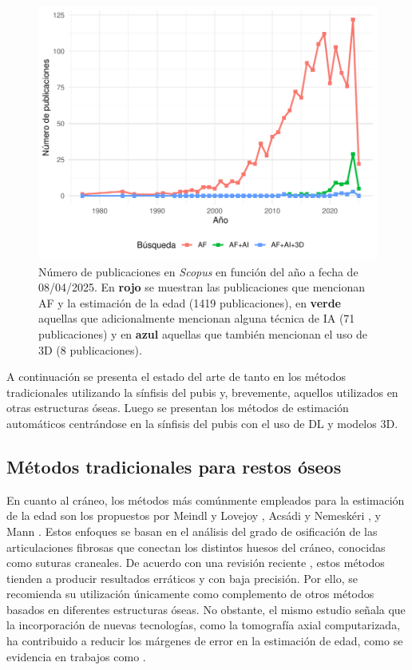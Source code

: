 \begin{figure}[h]
    \centering
    \includegraphics[width=\linewidth]{figures/3_sota/scopus_pubs.pdf}
    \caption[Publicaciones por año de AF, AF+IA y AF+IA+3D en Scopus]{Número de publicaciones en \textit{Scopus} en función del año a fecha de 08/04/2025. En {\color{Red} \textbf{rojo}} se muestran las publicaciones que mencionan AF y la estimación de la edad (1419 publicaciones), en {\color{LimeGreen} \textbf{verde}} aquellas que adicionalmente mencionan alguna técnica de IA (71 publicaciones) y en {\color{Blue} \textbf{azul}} aquellas que también mencionan el uso de 3D (8 publicaciones).}
    \label{fig:scopusData}
\end{figure}

A continuación se presenta el estado del arte de tanto en los métodos tradicionales utilizando la sínfisis del pubis y, brevemente, aquellos utilizados en otras estructuras óseas. Luego se presentan los métodos de estimación automáticos centrándose en la sínfisis del pubis con el uso de DL y modelos 3D.

\subsection{Métodos tradicionales para restos óseos}

En cuanto al cráneo, los métodos más comúnmente empleados para la estimación de la edad son los propuestos por Meindl y Lovejoy \cite{meindl1985ectocranial}, Acsádi y Nemeskéri \cite{acsadi1970history}, y Mann \cite{mann1991maxillary}. Estos enfoques se basan en el análisis del grado de osificación de las articulaciones fibrosas que conectan los distintos huesos del cráneo, conocidas como suturas craneales. De acuerdo con una revisión reciente \cite{ruengdit2020cranial}, estos métodos tienden a producir resultados erráticos y con baja precisión. Por ello, se recomienda su utilización únicamente como complemento de otros métodos basados en diferentes estructuras óseas. No obstante, el mismo estudio señala que la incorporación de nuevas tecnologías, como la tomografía axial computarizada, ha contribuido a reducir los márgenes de error en la estimación de edad, como se evidencia en trabajos como \cite{chiba2013age, boyd2015use}.

